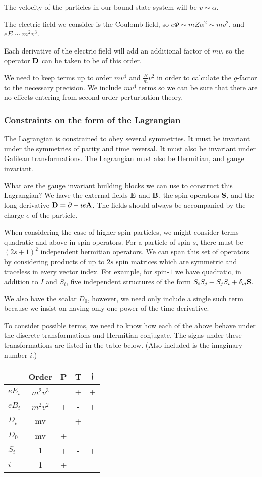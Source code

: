 The velocity of the particles in our bound state system will be $v \sim \alpha$.

The electric field we consider is the Coulomb field, so $e\Phi \sim m Z\alpha^2 \sim mv^2$, and $eE \sim m^2v^3$.

Each derivative of the electric field will add an additional factor of $mv$, so the operator $\mathbf{D}$ can be taken to be of this order.

We need to keep terms up to order $mv^4$ and $\frac{B}{m} v^2$ in order to calculate the $g$-factor to the necessary precision.  We include $mv^4$ terms so we can be sure that there are no effects entering from second-order perturbation theory.


\subsubsection{Constraints on the form of the Lagrangian}
The Lagrangian is constrained to obey several symmetries.  It must be invariant under the symmetries of parity and time reversal.  It must also be invariant under Galilean transformations.  The Lagrangian must also be Hermitian, and gauge invariant.

What are the gauge invariant building blocks we can use to construct this Lagrangian?  We have the external fields $\mathbf{E}$ and $\mathbf{B}$, the spin operators $\mathbf{S}$, and the long derivative $\mathbf{D} = \mathbf{\partial} - i e\mathbf{A}$.  The fields should always be accompanied by the charge $e$ of the particle.

When considering the case of higher spin particles, we might consider terms quadratic and above in spin operators.  For a particle of spin $s$, there must be $(2s+1)^2$ independent hermitian operators.  We can span this set of operators by considering products of up to $2s$ spin matrices which are symmetric and traceless in every vector index.  For example, for spin-$1$ we have quadratic, in addition to $I$ and $S_i$, five independent structures of the form $ S_i S_j + S_j S_i + \delta_{ij} \mathbf{S}$.




We also have the scalar $D_0$, however, we need only include a single such term because we insist on having only one power of the time derivative.

To consider possible terms, we need to know how each of the above behave under the discrete transformations and Hermitian conjugate.  The signs under these transformations are listed in the table below.  (Also included is the imaginary number $i$.)


\begin{tabular}{l|c|ccc}
& Order	&	P	&	T	&	$\dagger$	\\
\hline
$eE_i$	&$m^2v^3$	&	-	& 	+	&	+		\\
$eB_i$	&$m^2v^2$	&	+	&   -	&	+		\\
$D_i$		& mv	&	-	&	+	&	-		\\
$D_0$		& mv	&	+	&	-	&	-		\\
$S_i$		& 1		&	+	&	-	&	+		\\
$i$		& 1		&	+	&	-	&	-		\\
\end{tabular}








